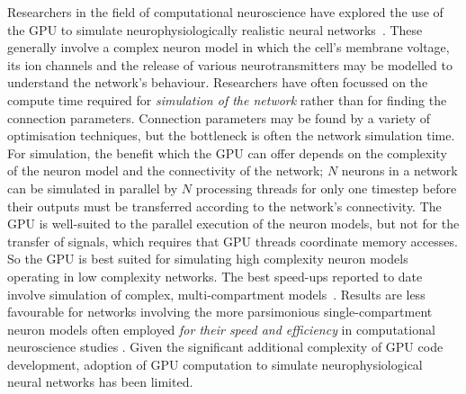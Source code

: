 \documentclass[12pt, a4paper]{article}
\begin{document}
Researchers in the field of computational neuroscience have explored the use
of the GPU to simulate neurophysiologically realistic neural
networks~\cite{beyeler_gpu-accelerated_2015,yavuz_genn_2016}. These
generally involve a complex neuron model in which the cell's membrane voltage,
its ion channels and the release of various neurotransmitters may be modelled
to understand the network's behaviour. Researchers have often focussed on the
compute time required for
\emph{simulation of the network}
rather than for finding the connection parameters. Connection parameters may
be found by a variety of optimisation techniques, but the bottleneck is often
the network simulation time. For simulation, the benefit which the GPU can
offer depends on the complexity of the neuron model and the connectivity of
the network; $N$ neurons in a network can be simulated in parallel by $N$
processing threads for only one timestep before their outputs must be
transferred according to the network's connectivity. The GPU is well-suited to
the parallel execution of the neuron models, but not for the transfer of
signals, which requires that GPU threads coordinate memory accesses. So the
GPU is best suited for simulating high complexity neuron models operating in
low complexity networks. The best speed-ups reported to date involve
simulation of complex, multi-compartment
models~\cite{stimberg_brian2genn_2020}. Results are less favourable for
networks involving the more parsimonious single-compartment neuron models
often employed \emph{for their speed and efficiency} in computational
neuroscience studies \cite{nageswaran_configurable_2009}. Given the
significant additional complexity of GPU code development, adoption of GPU
computation to simulate neurophysiological neural networks has been limited.
\end{document}
